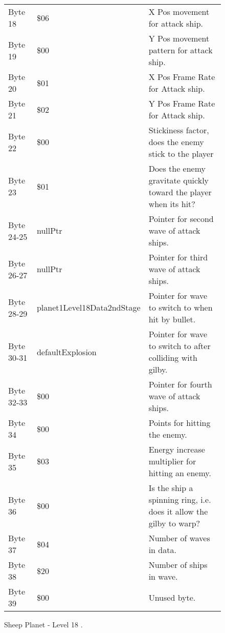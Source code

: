 \begin{figure}[H]
{\begin{adjustbox}{width=12cm}
\begin{tabular}{lll}
 Byte 18    & \$06                        & X Pos movement for attack ship.                                     \\
 Byte 19    & \$00                        & Y Pos movement pattern for attack ship.                             \\
 Byte 20    & \$01                        & X Pos Frame Rate for Attack ship.                                   \\
 Byte 21    & \$02                        & Y Pos Frame Rate for Attack ship.                                   \\
 Byte 22    & \$00                        & Stickiness factor, does the enemy stick to the player               \\
 Byte 23    & \$01                        & Does the enemy gravitate quickly toward the player when its hit?    \\
 Byte 24-25 & nullPtr                    & Pointer for second wave of attack ships.                            \\
 Byte 26-27 & nullPtr                    & Pointer for third wave of attack ships.                             \\
 Byte 28-29 & planet1Level18Data2ndStage & Pointer for wave to switch to when hit by bullet.                   \\
 Byte 30-31 & defaultExplosion           & Pointer for  wave to switch to after colliding with gilby.          \\
 Byte 32-33 & \$00                        & Pointer for fourth wave of attack ships.                            \\
 Byte 34    & \$00                        & Points for hitting the enemy.                                       \\
 Byte 35    & \$03                        & Energy increase multiplier for hitting an enemy.                    \\
 Byte 36    & \$00                        & Is the ship a spinning ring, i.e. does it allow the gilby to warp?  \\
 Byte 37    & \$04                        & Number of waves in data.                                            \\
 Byte 38    & \$20                        & Number of ships in wave.                                            \\
 Byte 39    & \$00                        & Unused byte.                                                        \\
\bottomrule
\end{tabular}

  \end{adjustbox}

  }\caption*{Sheep Planet - Level 18
.}
\end{figure}

